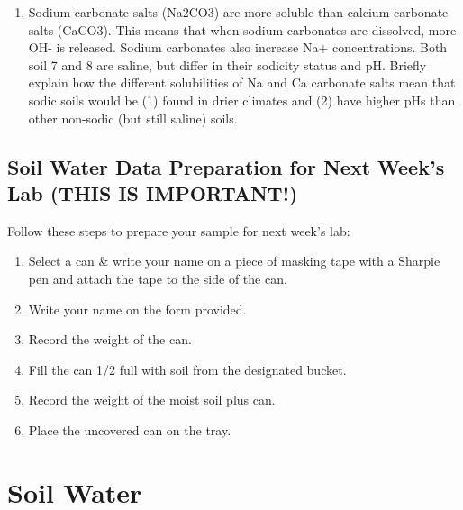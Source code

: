 \documentclass[
  letterpaper,
  twocolumn,
  portrait]{scrbook}
\providecommand{\tightlist}{%
  \setlength{\itemsep}{0pt}\setlength{\parskip}{0pt}}\usepackage{longtable,booktabs,array}
\begin{document}
\begin{enumerate}
\def\labelenumi{\arabic{enumi}.}
\setcounter{enumi}{8}
\tightlist
\item
  Sodium carbonate salts (Na2CO3) are more soluble than calcium
  carbonate salts (CaCO3). This means that when sodium carbonates are
  dissolved, more OH- is released. Sodium carbonates also increase Na+
  concentrations. Both soil 7 and 8 are saline, but differ in their
  sodicity status and pH. Briefly explain how the different solubilities
  of Na and Ca carbonate salts mean that sodic soils would be (1) found
  in drier climates and (2) have higher pHs than other non-sodic (but
  still saline) soils.
\end{enumerate}

\hypertarget{soil-water-data-preparation-for-next-weeks-lab-this-is-important}{%
\section{Soil Water Data Preparation for Next Week's Lab (THIS IS
IMPORTANT!)}\label{soil-water-data-preparation-for-next-weeks-lab-this-is-important}}

Follow these steps to prepare your sample for next week's lab:

\begin{enumerate}
\def\labelenumi{\arabic{enumi}.}
\tightlist
\item
  Select a can \& write your name on a piece of masking tape with a
  Sharpie pen and attach the tape to the side of the can.
\item
  Write your name on the form provided.
\item
  Record the weight of the can.
\item
  Fill the can 1/2 full with soil from the designated bucket.
\item
  Record the weight of the moist soil plus can.
\item
  Place the uncovered can on the tray.
\end{enumerate}


\hypertarget{soil-water}{%
\chapter{\texorpdfstring{\textbf{Soil
Water}}{Soil Water}}\label{soil-water}}
\end{document}
